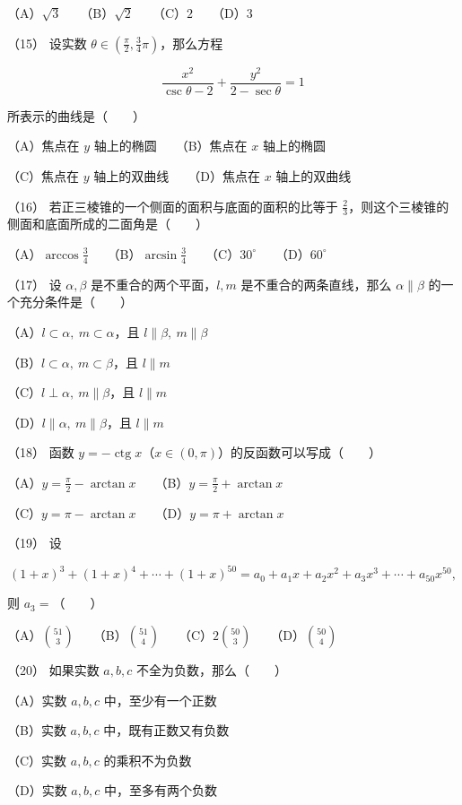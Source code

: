\begin{question}
（A）$\sqrt3$　　（B）$\sqrt2$　　（C）$2$　　（D）$3$

（15） 设实数 $\theta\in\left(\frac\pi2,\frac34\pi\right)$，那么方程

\nopagebreak[4]
\[
\frac{x^2}{\csc\theta-2}+\frac{y^2}{2-\sec\theta}=1
\]

所表示的曲线是\mbox{（　　）}

（A）焦点在 $y$ 轴上的椭圆　　（B）焦点在 $x$ 轴上的椭圆

（C）焦点在 $y$ 轴上的双曲线　　（D）焦点在 $x$ 轴上的双曲线

（16） 若正三棱锥的一个侧面的面积与底面的面积的比等于 $\frac23$，则这个三棱锥的侧面和底面所成的二面角是\mbox{（　　）}

（A）$\arccos\frac34$　　（B）$\arcsin\frac34$　　（C）$30^\circ$　　（D）$60^\circ$

（17） 设 $\alpha,\beta$ 是不重合的两个平面，$l,m$ 是不重合的两条直线，那么 $\alpha\parallel\beta$ 的一个充分条件是\mbox{（　　）}

（A）$l\subset\alpha,\ m\subset\alpha$，且 $l\parallel\beta,\ m\parallel\beta$

（B）$l\subset\alpha,\ m\subset\beta$，且 $l\parallel m$

（C）$l\perp\alpha,\ m\parallel\beta$，且 $l\parallel m$

（D）$l\parallel\alpha,\ m\parallel\beta$，且 $l\parallel m$

（18） 函数 $y=-\operatorname{ctg}x$（$x\in(0,\pi)$）的反函数可以写成\mbox{（　　）}

（A）$y=\frac\pi2-\arctan x$　　（B）$y=\frac\pi2+\arctan x$

（C）$y=\pi-\arctan x$　　（D）$y=\pi+\arctan x$

（19） 设

\nopagebreak[4]
\[
(1+x)^3+(1+x)^4+\cdots+(1+x)^{50}
=a_0+a_1x+a_2x^2+a_3x^3+\cdots+a_{50}x^{50},
\]

则 $a_3=$\mbox{（　　）}

（A）$\binom{51}{3}$　　（B）$\binom{51}{4}$　　（C）$2\binom{50}{3}$　　（D）$\binom{50}{4}$

（20） 如果实数 $a,b,c$ 不全为负数，那么\mbox{（　　）}

（A）实数 $a,b,c$ 中，至少有一个正数

（B）实数 $a,b,c$ 中，既有正数又有负数

（C）实数 $a,b,c$ 的乘积不为负数

（D）实数 $a,b,c$ 中，至多有两个负数


\end{question}
